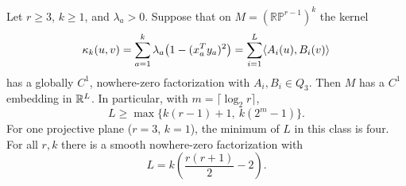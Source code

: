 \begin{theorem}\label{thm:projective-phase}
Let $r\geq3$, $k\geq1$, and $\lambda_a>0$. Suppose that on
$M=(\mathbb{RP}^{r-1})^k$ the kernel
\[
 \kappa_k(u,v)=\sum_{a=1}^k\lambda_a
                  \bigl(1-(x_a^Ty_a)^2\bigr)
       =\sum_{i=1}^L\langle A_i(u),B_i(v)\rangle
\]
has a globally $C^1$, nowhere-zero factorization with $A_i,B_i\in Q_3$.
Then $M$ has a $C^1$ embedding in $\mathbb R^L$. In particular, with
$m=\lceil\log_2 r\rceil$,
\begin{equation}\label{eq:projective-count}
 L\geq\max\{k(r-1)+1,\ k(2^m-1)\}.
\end{equation}
For one projective plane ($r=3$, $k=1$), the minimum of $L$ in this
class is four. For all $r,k$ there is a smooth nowhere-zero factorization with
\begin{equation}\label{eq:projective-upper}
 L=k\left(\frac{r(r+1)}2-2\right).
\end{equation}
\end{theorem}
